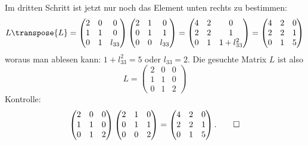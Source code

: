 \begin{loesung}
Im dritten Schritt ist jetzt nur noch das Element unten rechts zu bestimmen:
\[
L\transpose{L}=
\begin{pmatrix}
2&0&     0\\
1&1&     0\\
0&1&l_{33}
\end{pmatrix}
\begin{pmatrix}
2&1&     0\\
0&1&     1\\
0&0&l_{33}
\end{pmatrix}
=
\begin{pmatrix}
4&2&0\\
2&2&1\\
0&1&1+l_{33}^2
\end{pmatrix}
=
\begin{pmatrix}
4&2&0\\
2&2&1\\
0&1&5
\end{pmatrix}
\]
woraus man ablesen kann: $1+l_{33}^2=5$ oder $l_{33}=2$. Die gesuchte
Matrix $L$ ist also
\[
L=
\begin{pmatrix}
2&0&0\\
1&1&0\\
0&1&2
\end{pmatrix}
\]
Kontrolle:
\[
\begin{pmatrix}
2&0&0\\
1&1&0\\
0&1&2
\end{pmatrix}
\begin{pmatrix}
2&1&0\\
0&1&1\\
0&0&2
\end{pmatrix}
=
\begin{pmatrix}
4&2&0\\
2&2&1\\
0&1&5
\end{pmatrix}.
\qedhere
\]
\end{loesung}

